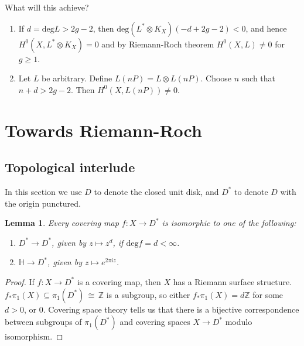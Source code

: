 \documentclass[12pt]{article}
\theoremstyle{plain}
\newtheorem{lemma}[equation]{Lemma}
\theoremstyle{definition}
\newcommand{\IH}{\mathbb{H}}
\newcommand{\IZ}{\mathbb{Z}}
\renewcommand{\deg}{\mathrm{deg}}
\newcommand\iso{{\, \cong \,}}
\newcommand\tensor{{\otimes}}
\newcommand{\<}{\langle}
\renewcommand{\>}{\rangle}
\begin{document}
What will this achieve? 
\begin{enumerate}
\item If $d = \deg L > 2g - 2$, then $\deg(L^* \tensor K_X)(-d + 2g - 2) < 0$, and hence $H^0(X, L^* \tensor K_X) = 0$ and by Riemann-Roch theorem $H^0(X, L) \neq 0$ for $g \ge 1$. 
\item Let $L$ be arbitrary. Define $L(nP) = L \tensor L(nP)$. Choose $n$ such that $n + d > 2g - 2$. Then $H^0(X, L(nP)) \neq 0$.    
\end{enumerate}







\section{Towards Riemann-Roch}
\subsection{Topological interlude}
In this section we use $D$ to denote the closed unit disk, and $D^*$ to denote $D$ with the origin punctured. 
\begin{lemma}
\label{diskcover}
Every covering map $f : X \to D^*$ is isomorphic to one of the following: 
\begin{enumerate}
\item $D^* \to D^*$, given by $z \mapsto z^d$, if $\deg f = d < \infty$. 
\item $\IH \to D^*$, given by $z \mapsto e^{2 \pi i z}$. 
\end{enumerate}
\end{lemma}
\begin{proof}
If $f : X \to D^*$ is a covering map, then $X$ has a Riemann surface structure. $f_* \pi_1(X) \subseteq \pi_1(D^*) \iso \IZ$ is a subgroup, so either $f_* \pi_1(X) = d\IZ$ for some $d > 0$, or $0$. Covering space theory tells us that there is a bijective correspondence between subgroups of $\pi_1(D^*)$ and covering spaces $X \to D^*$ modulo isomorphism. 
\end{proof}
\end{document}

